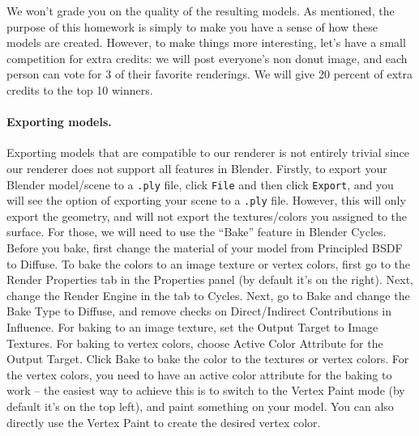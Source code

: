 We won't grade you on the quality of the resulting models. As mentioned, the purpose of this homework is simply to make you have a sense of how these models are created. However, to make things more interesting, let's have a small competition for extra credits: we will post everyone's non donut image, and each person can vote for 3 of their favorite renderings. We will give 20 percent of extra credits to the top 10 winners.

\paragraph{Exporting models.} Exporting models that are compatible to our renderer is not entirely trivial since our renderer does not support all features in Blender. Firstly, to export your Blender model/scene to a \lstinline{.ply} file, click \lstinline{File} and then click \lstinline{Export}, and you will see the option of exporting your scene to a \lstinline{.ply} file. However, this will only export the geometry, and will not export the textures/colors you assigned to the surface. For those, we will need to use the ``Bake'' feature in Blender Cycles. Before you bake, first change the material of your model from Principled BSDF to Diffuse. To bake the colors to an image texture or vertex colors, first go to the Render Properties tab in the Properties panel (by default it's on the right). Next, change the Render Engine in the tab to Cycles. Next, go to Bake and change the Bake Type to Diffuse, and remove checks on Direct/Indirect Contributions in Influence. For baking to an image texture, set the Output Target to Image Textures. For baking to vertex colors, choose Active Color Attribute for the Output Target. Click Bake to bake the color to the textures or vertex colors. For the vertex colors, you need to have an active color attribute for the baking to work -- the easiest way to achieve this is to switch to the Vertex Paint mode (by default it's on the top left), and paint something on your model. You can also directly use the Vertex Paint to create the desired vertex color.


